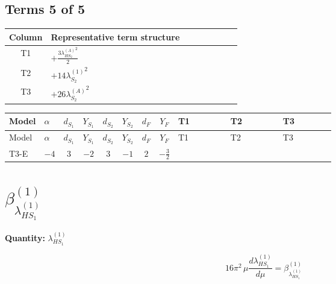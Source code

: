\documentclass[8pt]{article}
\begin{document}
\begin{landscape}
\subsection*{Terms 5 of 5}
\begin{center}
\begin{tabular}{@{}c >{\raggedright\arraybackslash}p{0.82\linewidth}@{}}
\toprule
Column & Representative term structure \\
\midrule
T1 & \(\displaystyle +\frac{3 {\lambda_{HS_2}^{(A)}}^2}{2}\) \\
\midrule
T2 & \(\displaystyle +14 {\lambda_{S_2}^{(1)}}^2\) \\
\midrule
T3 & \(\displaystyle +26 {\lambda_{S_2}^{(A)}}^2\) \\
\midrule
\bottomrule
\end{tabular}
\end{center}
\smallskip
\tiny
\begin{longtable}{@{}llcccccc >{\raggedright\arraybackslash}p{0.21\linewidth} >{\raggedright\arraybackslash}p{0.21\linewidth} >{\raggedright\arraybackslash}p{0.21\linewidth}@{}}
\toprule
Model & $\alpha$ & $d_{S_1}$ & $Y_{S_1}$ & $d_{S_2}$ & $Y_{S_2}$ & $d_F$ & $Y_F$ & T1 & T2 & T3 \\
\midrule
\endfirsthead
\toprule
Model & $\alpha$ & $d_{S_1}$ & $Y_{S_1}$ & $d_{S_2}$ & $Y_{S_2}$ & $d_F$ & $Y_F$ & T1 & T2 & T3 \\
\midrule
\endhead
T3-E & $-4$ & $3$ & $-2$ & $3$ & $-1$ & $2$ & $-\frac{3}{2}$ & \scriptsize\adjustbox{max width=\linewidth}{$\begin{gathered} +\frac{3 {\lambda_{HS_2}^{(A)}}^2}{2}\end{gathered}$} & \scriptsize\adjustbox{max width=\linewidth}{$\begin{gathered} +14 {\lambda_{S_2}^{(1)}}^2\end{gathered}$} & \scriptsize\adjustbox{max width=\linewidth}{$\begin{gathered} +26 {\lambda_{S_2}^{(A)}}^2\end{gathered}$} \\
\midrule
\bottomrule
\end{longtable}
\clearpage
\section*{$\beta_{\lambda_{HS_1}^{(1)}}^{(1)}$}
\noindent\textbf{Quantity: }$\lambda_{HS_1}^{(1)}$\par\smallskip
\[16\pi^2\,\mu\frac{d \lambda_{HS_1}^{(1)}}{d\mu}=\beta_{\lambda_{HS_1}^{(1)}}^{(1)}\]

\end{landscape}
\end{document}
